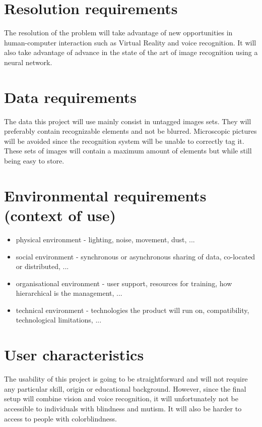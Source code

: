 \documentclass[11pt,a4paper]{article}
\begin{document}
\section{Resolution requirements}

The resolution of the problem will take advantage of new opportunities in human-computer interaction such as Virtual Reality and voice recognition. It will also take advantage of advance in the state of the art of image recognition using a neural network.

\section{Data requirements}

The data this project will use mainly consist in untagged images sets. They will preferably contain recognizable elements and not be blurred. Microscopic pictures will be avoided since the recognition system will be unable to correctly tag it. These sets of images will contain a maximum amount of elements but while still being easy to store. 


\section{Environmental requirements (context of use)\todo{}}

\begin{itemize}
\item physical environment
- lighting, noise, movement, dust, ...
\item social environment
- synchronous or asynchronous sharing of data, co-located or distributed, ...
\item organisational environment
- user support, resources for training, how hierarchical is the management, ...
\item technical environment
- technologies the product will run on, compatibility, technological limitations, ...
\end{itemize}

\section{User characteristics}

The usability of this project is going to be straightforward and will not require any particular skill, origin or educational background. However, since the final setup will combine vision and voice recognition, it will unfortunately not be accessible to individuals with blindness and mutism. It will also be harder to access to people with colorblindness. 
\end{document}
